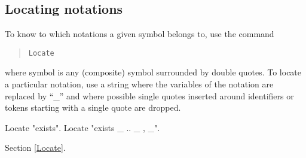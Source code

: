\subsection{Locating notations
\label{LocateSymbol}}

To know to which notations a given symbol belongs to, use the command
\begin{quote}
\tt Locate {\symbolentry}
\end{quote}
where symbol is any (composite) symbol surrounded by double quotes. To locate
a particular notation, use a string where the variables of the
notation are replaced by ``\_'' and where possible single quotes
inserted around identifiers or tokens starting with a single quote are
dropped.

\Example
\begin{coq_example}
Locate "exists".
Locate "exists _ .. _ , _".
\end{coq_example}

\SeeAlso Section \ref{Locate}.

